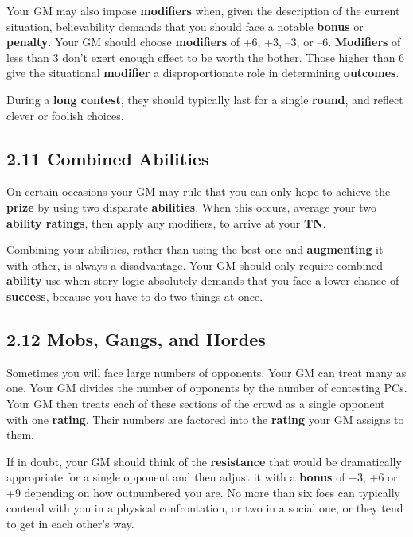 \documentclass[
]{article}
\begin{document}
Your GM may also impose \textbf{modifiers} when, given the description
of the current situation, believability demands that you should face a
notable \textbf{bonus} or \textbf{penalty}. Your GM should choose
\textbf{modifiers} of +6, +3, --3, or --6. \textbf{Modifiers} of less
than 3 don't exert enough effect to be worth the bother. Those higher
than 6 give the situational \textbf{modifier} a disproportionate role in
determining \textbf{outcomes}.

During a \textbf{long contest}, they should typically last for a single
\textbf{round}, and reflect clever or foolish choices.

\hypertarget{combined-abilities}{%
\subsection{2.11 Combined Abilities}\label{combined-abilities}}

On certain occasions your GM may rule that you can only hope to achieve
the \textbf{prize} by using two disparate \textbf{abilities}. When this
occurs, average your two \textbf{ability ratings}, then apply any
modifiers, to arrive at your \textbf{TN}.

Combining your abilities, rather than using the best one and
\textbf{augmenting} it with other, is always a disadvantage. Your GM
should only require combined \textbf{ability} use when story logic
absolutely demands that you face a lower chance of \textbf{success},
because you have to do two things at once.

\hypertarget{mobs-gangs-and-hordes}{%
\subsection{2.12 Mobs, Gangs, and Hordes}\label{mobs-gangs-and-hordes}}

Sometimes you will face large numbers of opponents. Your GM can treat
many as one. Your GM divides the number of opponents by the number of
contesting PCs. Your GM then treats each of these sections of the crowd
as a single opponent with one \textbf{rating}. Their numbers are
factored into the \textbf{rating} your GM assigns to them.

If in doubt, your GM should think of the \textbf{resistance} that would
be dramatically appropriate for a single opponent and then adjust it
with a \textbf{bonus} of +3, +6 or +9 depending on how outnumbered you
are. No more than six foes can typically contend with you in a physical
confrontation, or two in a social one, or they tend to get in each
other's way.
\end{document}
